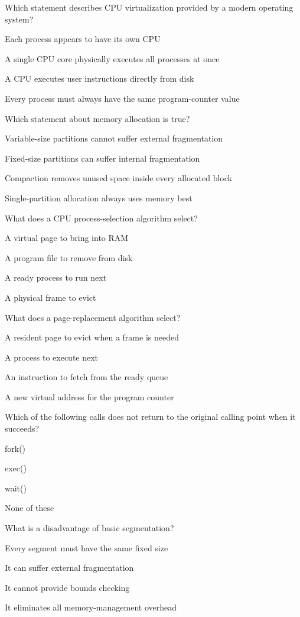 \begin{questions}\setlength{\itemsep}{0.12cm}\setcounter{question}{18}
\question Which statement describes CPU virtualization provided by a modern operating system?
\begin{verticalchoices}
\item Each process appears to have its own CPU
\item A single CPU core physically executes all processes at once
\item A CPU executes user instructions directly from disk
\item Every process must always have the same program-counter value
\end{verticalchoices}
\question Which statement about memory allocation is true?
\begin{verticalchoices}
\item Variable-size partitions cannot suffer external fragmentation
\item Fixed-size partitions can suffer internal fragmentation
\item Compaction removes unused space inside every allocated block
\item Single-partition allocation always uses memory best
\end{verticalchoices}
\question What does a CPU process-selection algorithm select?
\begin{verticalchoices}
\item A virtual page to bring into RAM
\item A program file to remove from disk
\item A ready process to run next
\item A physical frame to evict
\end{verticalchoices}
\question What does a page-replacement algorithm select?
\begin{verticalchoices}
\item A resident page to evict when a frame is needed
\item A process to execute next
\item An instruction to fetch from the ready queue
\item A new virtual address for the program counter
\end{verticalchoices}
\question Which of the following calls does not return to the original calling point when it succeeds?
\begin{verticalchoices}
\item fork()
\item exec()
\item wait()
\item None of these
\end{verticalchoices}
\question What is a disadvantage of basic segmentation?
\begin{verticalchoices}
\item Every segment must have the same fixed size
\item It can suffer external fragmentation
\item It cannot provide bounds checking
\item It eliminates all memory-management overhead
\end{verticalchoices}
\end{questions}\vfill\newpage
